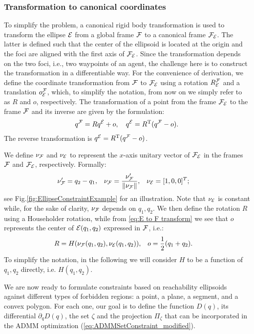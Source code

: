 \documentclass[journal]{IEEEtran}  %
\begin{document}
\subsubsection{Transformation to canonical coordinates}\label{sec:rotation2Standard}
  To simplify the problem, a canonical rigid body transformation is used to transform the ellipse $\mathcal{E}$ from a global frame $\mathcal{F}$ to a canonical frame $\mathcal{F}_{\mathcal{E}}$. The latter is defined such that the center of the ellipsoid is located at the origin and the foci are aligned with the first axis of $\mathcal{F}_{\mathcal{E}}$. Since the transformation depends on the two foci, i.e., two waypoints of an agent, the challenge here is to construct the transformation in a differentiable way.
  For the convenience of derivation, we define the coordinate transformation from $\mathcal{F}$ to $\mathcal{F}_{\mathcal{E}}$ using a rotation $R^{\mathcal{F}}_{\mathcal{E}}$ and a translation $o^{\mathcal{F}}_{\mathcal{E}}$, which, to simplify the notation, from now on we simply refer to as $R$ and $o$, respectively. The transformation of a point from the frame $\mathcal{F}_{\mathcal{E}}$ to the frame $\mathcal{F}$ and its inverse are given by the formulation:
  \begin{equation}
    {q^{\mathcal{F}}}=R{q^{\mathcal{E}}}+o,\label{eq:E to F transform}\quad
    {q^{\mathcal{E}}}=R^\mathrm{T}({q^{\mathcal{F}}}-o).
  \end{equation}
  The reverse transformation is ${q^{\mathcal{E}}}=R^\mathrm{T}( {q^{\mathcal{F}}}-o)$.

  We define $\nu_{\mathcal{F}}$ and $\nu_{\mathcal{E}}$ to represent the $x$-axis unitary vector of $\mathcal{F}_{\mathcal{E}}$ in the frames $\mathcal{F}$ and $\mathcal{F}_{\mathcal{E}}$, respectively. Formally:
  \begin{align}
    \nu'_{\mathcal{F}}&=q_2-q_1, & \nu_{\mathcal{F}} &= \frac{\nu'_{\mathcal{F}}}{\lVert\nu_{\mathcal{F}}\rVert}, & \nu_{\mathcal{E}}&=[1,0,0]^T;
  \end{align}
  see Fig.\ref{fig:EllipseConstraintExample} for an illustration. Note that $\nu_{\mathcal{E}}$ is constant while, for the sake of clarity, $\nu_{\mathcal{F}}$ depends on $q_1,q_2$. We then define the rotation $R$ using a Householder rotation, while from \eqref{eq:E to F transform} we see that $o$ represents the center of $\mathcal{E}(q_1,q_2)$ expressed in $\mathcal{F}$, i.e.:
  \begin{align} 
    R&=H(\nu_{\mathcal{F}}(q_1,q_2),\nu_{\mathcal{E}}(q_1,q_2)), &o&=\frac{1}{2}(q_1+q_2).
  \end{align}
  To simplify the notation, in the following we will consider $H$ to be a function of $q_1,q_2$ directly, i.e. $H(q_1,q_2)$.

We are now ready to formulate constraints based on reachability ellipsoids against different types of forbidden regions: a point, a plane, a segment, and a convex polygon. For each one, our goal is to define the function $D(q)$, its differential $\partial_qD(q)$, the set $\zeta$ and the projection $\Pi_\zeta$ that can be incorporated in the ADMM optimization (\ref{eq:ADMMSetConstraint_modified}).
\end{document}
